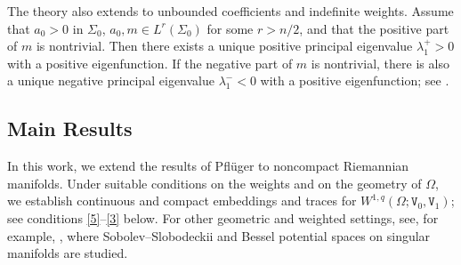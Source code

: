 \documentclass[reqno, 11pt, a4paper]{amsart}
\numberwithin{equation}{section}
\newcommand{\wghtv}{\mathtt{V}}
\newcommand{\qxp}{q}
\begin{document}
{ 
The theory also extends to unbounded coefficients and indefinite weights. Assume that $a_0>0$ in $\Sigma_0$, $a_0,m\in L^r(\Sigma_0)$ for some $r>n/2$, and that the positive part of $m$ is nontrivial. Then there exists a unique positive principal eigenvalue $\lambda_1^+>0$ with a positive eigenfunction. If the negative part of $m$ is nontrivial, there is also a unique negative principal eigenvalue $\lambda_1^-<0$ with a positive eigenfunction; see \cite{figuereido1982semilinearelliptic, brown1980existence, weinberger1974variational}.
}






\subsection{Main Results} In this work, we extend the results of Pflüger \cite{pfluger1998compactraces} to noncompact Riemannian manifolds. Under suitable conditions on the weights and on the geometry of \(\Omega\), we establish continuous and compact embeddings and traces for \(W^{1,\qxp}(\Omega;\wghtv_0,\wghtv_1)\); see conditions \ref{5}--\ref{3} below. For other geometric and weighted settings, see, for example, \cite{hamann2013singularmanifolds}, where Sobolev--Slobodeckii and Bessel potential spaces on singular manifolds are studied.
\end{document}

